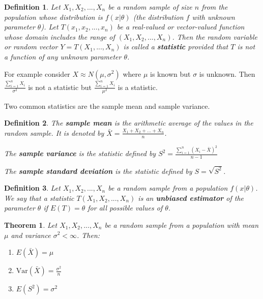 \documentclass[14pt,twoside]{extreport}
\theoremstyle{dotless}
\newtheorem*{defn}{Definition}
\newtheorem*{thm}{Theorem} %
\begin{document}
\begin{defn}
    Let $X_1, X_2, ..., X_n$ be a random sample of size $n$ from the population whose distribution is $f\left (x|\theta\right )$ (the distribution $f$ with unknown parameter $\theta$). Let $T\left (x_1, x_2, ...,x_n\right )$ be a real-valued or vector-valued function whose domain includes the range of $\left (X_1, X_2, ..., X_n\right )$. Then the random variable or random vector $Y = T\left (X_1, ..., X_n\right )$ is called a \textbf{statistic} provided that $T$ is not a function of any unknown parameter $\theta$.
\end{defn}

For example consider $X \approx N(\mu, \sigma^2)$ where $\mu$ is known but $\sigma$ is unknown. Then $\frac{\sum_{i=1}^n X_i}{\sigma^2}$ is not a statistic but $\frac{\sum_{i=1}^n X_i}{\mu^2}$ is a statistic.

Two common statistics are the sample mean and sample variance.

\begin{defn}
    The \textbf{sample mean} is the arithmetic average of the values in the random sample. It is denoted by $\bar{X} = \displaystyle \frac{X_1 + X_2 + ... + X_n}{n}$.

    The \textbf{sample variance} is the statistic defined by $S^2 = \displaystyle \frac{\sum_{i=1}^n \left (X_i - \bar{X}\right )^2}{n-1}$

    The \textbf{sample standard deviation} is the statistic defined by $S = \sqrt{S^2}$.
\end{defn}

\begin{defn}
    Let $X_1, X_2, ..., X_n$ be a random sample from a population $f\left (x| \theta\right )$. We say that a statistic $T\left (X_1, X_2, ...,X_n\right )$ is an \textbf{unbiased estimator} of the parameter $\theta$ if $E(T) = \theta$ for all possible values of $\theta$.
\end{defn}

\begin{thm}
    Let $X_1, X_2, ..., X_n$ be a random sample from a population with mean $\mu $ and variance $\sigma ^2 < \infty$. Then:
    \begin{enumerate}
        \item $E\left (\bar{X}\right ) = \mu $
        \item $\text{Var}\left (\bar{X}\right ) = \frac{\sigma ^2}{n}$
        \item $E\left (S ^2\right ) = \sigma ^2$
    \end{enumerate}
\end{thm}
\end{document}
